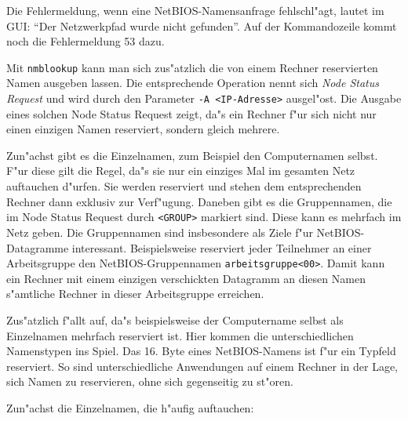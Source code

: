 \documentclass{scrartcl}
\newcommand{\prog}{\texttt}
\newcommand{\nbname}{\texttt}
\newcommand{\defin}{\emph}
\begin{document}
Die Fehlermeldung, wenn eine NetBIOS-Namensanfrage fehlschl"agt,
lautet im GUI: "`Der Netzwerkpfad wurde nicht gefunden"'. Auf der
Kommandozeile kommt noch die Fehlermeldung 53 dazu.

Mit \prog{nmblookup} kann man sich zus"atzlich die von einem Rechner
reservierten Namen ausgeben lassen. Die entsprechende Operation nennt
sich \defin{Node Status Request} und wird durch den Parameter \prog{-A
  <IP-Adresse>} ausgel"ost. Die Ausgabe eines solchen Node Status
Request zeigt, da"s ein Rechner f"ur sich nicht nur einen einzigen
Namen reserviert, sondern gleich mehrere.

Zun"achst gibt es die Einzelnamen, zum Beispiel den Computernamen
selbst.  F"ur diese gilt die Regel, da"s sie nur ein einziges Mal im
gesamten Netz auftauchen d"urfen. Sie werden reserviert und stehen dem
entsprechenden Rechner dann exklusiv zur Verf"ugung. Daneben gibt es
die Gruppennamen, die im Node Status Request durch \texttt{<GROUP>}
markiert sind. Diese kann es mehrfach im Netz geben. Die Gruppennamen
sind insbesondere als Ziele f"ur NetBIOS-Datagramme interessant.
Beispielsweise reserviert jeder Teilnehmer an einer Arbeitsgruppe den
NetBIOS-Gruppennamen \nbname{arbeitsgruppe<00>}. Damit kann ein
Rechner mit einem einzigen verschickten Datagramm an diesen Namen
s"amtliche Rechner in dieser Arbeitsgruppe erreichen.

Zus"atzlich f"allt auf, da"s beispielsweise der Computername selbst
als Einzelnamen mehrfach reserviert ist. Hier kommen die
unterschiedlichen Namenstypen ins Spiel. Das 16. Byte eines
NetBIOS-Namens ist f"ur ein Typfeld reserviert. So sind
unterschiedliche Anwendungen auf einem Rechner in der Lage, sich Namen
zu reservieren, ohne sich gegenseitig zu st"oren.

Zun"achst die Einzelnamen, die h"aufig auftauchen:
\end{document}
